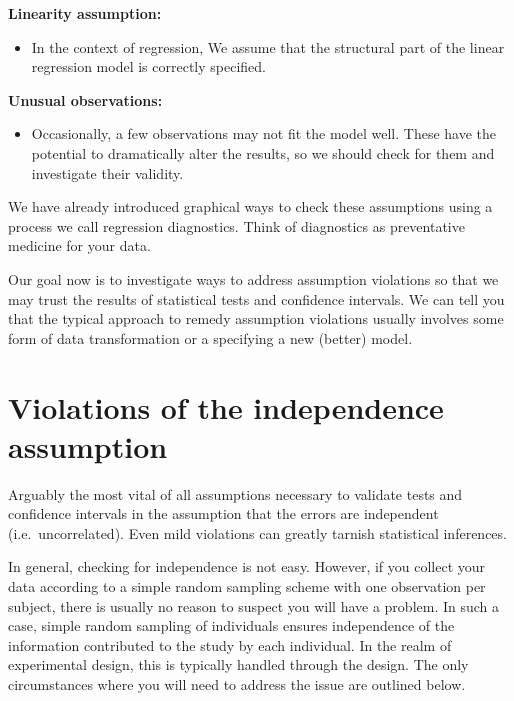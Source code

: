 \documentclass[
]{book}
\providecommand{\tightlist}{%
  \setlength{\itemsep}{0pt}\setlength{\parskip}{0pt}}
\begin{document}
\textbf{Linearity assumption:}

\begin{itemize}
\tightlist
\item
  In the context of regression, We assume that the structural part of the linear regression model is correctly specified.
\end{itemize}

\textbf{Unusual observations:}

\begin{itemize}
\tightlist
\item
  Occasionally, a few observations may not fit the model well. These have the potential to dramatically alter the results, so we should check for them and investigate their validity.
\end{itemize}

We have already introduced graphical ways to check these assumptions using a process we call regression diagnostics. Think of diagnostics as preventative medicine for your data.

Our goal now is to investigate ways to address assumption violations so that we may trust the results of statistical tests and confidence intervals. We can tell you that the typical approach to remedy assumption violations usually involves some form of data transformation or a specifying a new (better) model.

\hypertarget{violations-of-the-independence-assumption}{%
\section{Violations of the independence assumption}\label{violations-of-the-independence-assumption}}

Arguably the most vital of all assumptions necessary to validate tests and confidence intervals in the assumption that the errors are independent (i.e.~uncorrelated). Even mild violations can greatly tarnish statistical inferences.

In general, checking for independence is not easy. However, if you collect your data according to a simple random sampling scheme with one observation per subject, there is usually no reason to suspect you will have a problem. In such a case, simple random sampling of individuals ensures independence of the information contributed to the study by each individual. In the realm of experimental design, this is typically handled through the design. The only circumstances where you will need to address the issue are outlined below.
\end{document}

